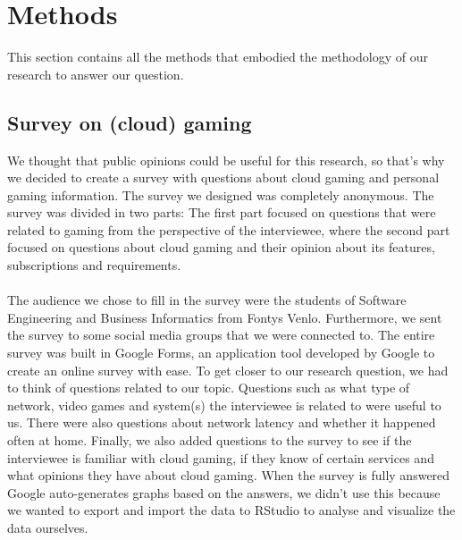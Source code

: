 \section{Methods}
This section contains all the methods that embodied the methodology of our research to answer our question.

\subsection{Survey on (cloud) gaming}
We thought that public opinions could be useful for this research, so that's why we decided to create a survey with questions about cloud gaming and personal gaming information. The survey we designed was completely anonymous. The survey was divided in two parts: The first part focused on questions that were related to gaming from the perspective of the interviewee, where the second part focused on questions about cloud gaming and their opinion about its features, subscriptions and requirements.
\\\\
The audience we chose to fill in the survey were the students of Software Engineering and Business Informatics from Fontys Venlo. Furthermore, we sent the survey to some social media groups that we were connected to. The entire survey was built in Google Forms, an application tool developed by Google to create an online survey with ease. To get closer to our research question, we had to think of questions related to our topic. 
Questions such as what type of network, video games and system(s) the interviewee is related to were useful to us. There were also questions about network latency and whether it happened often at home. Finally, we also added questions to the survey to see if the interviewee is familiar with cloud gaming, if they know of certain services and what opinions they have about cloud gaming. When the survey is fully answered Google auto-generates graphs based on the answers, we didn't use this because we wanted to export and import the data to RStudio to analyse and visualize the data ourselves.
\\\\
